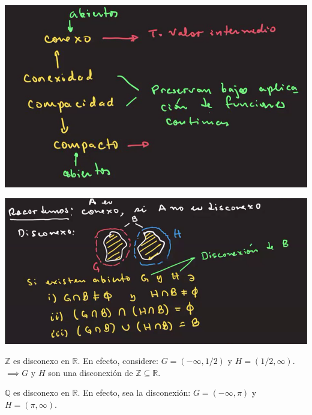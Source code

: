 	\begin{center}
	\includegraphics[scale=0.4]{images/2/16}
\end{center}

\begin{center}
	\includegraphics[scale=0.4]{images/2/17}
\end{center}

\begin{ejemplo}
	$\mathbb{Z}$ es disconexo en $\mathbb{R}$. En efecto, considere: $G=(-\infty, 1/2)$ y $H=(1/2,\infty)$. $\implies G$ y $H$ son una disconexión de $\mathbb{Z}\subseteq \mathbb{R}$. 
\end{ejemplo}
\begin{ejemplo}
	$\mathbb{Q}$ es disconexo en $\mathbb{R}$. En efecto, sea la disconexión: $G=(-\infty, \pi)$ y $H=(\pi, \infty)$.
\end{ejemplo}

